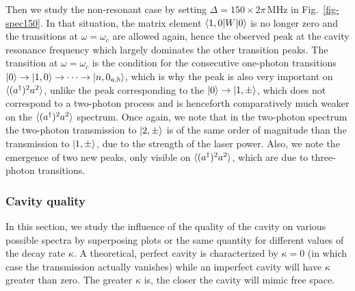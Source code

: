 Then we study the non-resonant case by setting $\Delta=150 \times 2\pi\,\mbox{MHz}$ in Fig.~\ref{fig-spec150}. In that situation, the matrix element $\langle 1,0 | W | 0 \rangle$ is no longer zero and the transitions at $\omega=\omega_c$ are allowed again, hence the observed peak at the cavity resonance frequency which largely dominates the other transition peaks. The transition at $\omega=\omega_c$ is the condition for the consecutive one-photon transitions $| 0 \rangle \rightarrow | 1,0 \rangle\rightarrow \cdots \rightarrow | n,0_{a,b} \rangle$, which is why the peak is also very important on $\langle (a^\dagger)^2 a^2 \rangle$, unlike the peak corresponding to the $| 0 \rangle \rightarrow | 1,\pm \rangle$, which does not correspond to a two-photon process and is henceforth comparatively much weaker on the $\langle (a^\dagger)^2 a^2 \rangle$ spectrum. Once again,  we note that in the two-photon spectrum the two-photon transmission to $| 2,\pm \rangle$ is of the same order of magnitude than the transmission to $| 1,\pm \rangle$, due to the strength of the laser power. Also, we note the emergence of two new peaks, only visible on $\langle (a^\dagger)^2 a^2 \rangle$, which are due to three-photon transitions.


\subsubsection{Cavity quality}

In this section, we study the influence of the quality of the cavity on various possible spectra by superposing plots or the same quantity for different values of the decay rate $\kappa$. A theoretical, perfect cavity is characterized by $\kappa=0$ (in which case the transmission actually vanishes) while an imperfect cavity will have $\kappa$ greater than zero. The greater $\kappa$ is, the closer the cavity will mimic free space.


